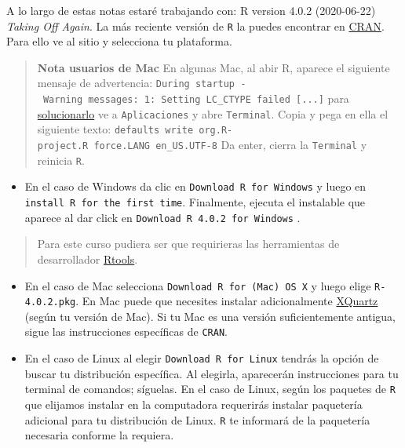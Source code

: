 \documentclass[
]{book}
\providecommand{\tightlist}{%
  \setlength{\itemsep}{0pt}\setlength{\parskip}{0pt}}
\begin{document}
A lo largo de estas notas estaré trabajando con: R version 4.0.2 (2020-06-22) \emph{Taking Off Again}. La más reciente versión de \texttt{R} la puedes encontrar en \href{https://cran.r-project.org}{CRAN}. Para ello ve al sitio y selecciona tu plataforma.

\begin{quote}
\textbf{Nota usuarios de Mac} En algunas Mac, al abir R, aparece el siguiente mensaje de advertencia:
\texttt{During\ startup\ -\ Warning\ messages:\ 1:\ Setting\ LC\_CTYPE\ failed\ {[}...{]}}
para \href{https://stackoverflow.com/questions/9689104/installing-r-on-mac-warning-messages-setting-lc-ctype-failed-using-c}{solucionarlo} ve a \texttt{Aplicaciones} y abre \texttt{Terminal}. Copia y pega en ella el siguiente texto:
\texttt{defaults\ write\ org.R-project.R\ force.LANG\ en\_US.UTF-8}
Da enter, cierra la \texttt{Terminal} y reinicia \texttt{R}.
\end{quote}

\begin{itemize}
\tightlist
\item
  En el caso de Windows da clic en \texttt{Download\ R\ for\ Windows} y luego en \texttt{install\ R\ for\ the\ first\ time}. Finalmente, ejecuta el instalable que aparece al dar click en \texttt{Download\ R\ 4.0.2\ for\ Windows} .
\end{itemize}

\begin{quote}
Para este curso pudiera ser que requirieras las herramientas de desarrollador \href{https://cran.r-project.org/bin/windows/Rtools/}{Rtools}.
\end{quote}

\begin{itemize}
\item
  En el caso de Mac selecciona \texttt{Download\ R\ for\ (Mac)\ OS\ X} y luego elige \texttt{R-4.0.2.pkg}. En Mac puede que necesites instalar adicionalmente \href{https://www.xquartz.org}{XQuartz} (según tu versión de Mac). Si tu Mac es una versión suficientemente antigua, sigue las instrucciones específicas de \texttt{CRAN}.
\item
  En el caso de Linux al elegir \texttt{Download\ R\ for\ Linux} tendrás la opción de buscar tu distribución específica. Al elegirla, aparecerán instrucciones para tu terminal de comandos; síguelas. En el caso de Linux, según los paquetes de \texttt{R} que elijamos instalar en la computadora requerirás instalar paquetería adicional para tu distribución de Linux. \texttt{R} te informará de la paquetería necesaria conforme la requiera.
\end{itemize}
\end{document}
